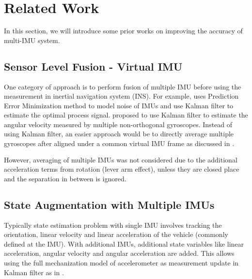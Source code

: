 \documentclass[conference]{IEEEtran}
\begin{document}

\section{Related Work}

In this section, we will introduce some prior works on improving the accuracy of multi-IMU system.


\subsection{Sensor Level Fusion - Virtual IMU}\label{VIMU}

One category of approach is to perform fusion of multiple IMU before using the measurement in inertial navigation system (INS). For example, \cite{jafari2014_PEM} uses Prediction Error Minimization method to model noise of IMUs and use Kalman filter to estimate the optimal process signal. \cite{xue2023} proposed to use Kalman filter to estimate the angular velocity measured by multiple non-orthogonal gyroscopes. Instead of using Kalman filter, an easier approach would be to directly average multiple gyroscopes after aligned under a common virtual IMU frame as discussed in \cite{waegli2008, patel2022_multi-imu, Colomina2004REDUNDANTIF}.

However, averaging of multiple IMUs was not considered due to the additional acceleration terms from rotation (lever arm effect), unless they are closed place and the separation in between is ignored.

\subsection{State Augmentation with Multiple IMUs}\label{augmented}

Typically state estimation problem with single IMU involves tracking the orientation, linear velocity and linear acceleration of the vehicle (commonly defined at the IMU). With additional IMUs, additional state variables like linear acceleration, angular velocity and angular acceleration are added. This allows using the full mechanization model of accelerometer as measurement update in Kalman filter as in \cite{Bancroft2011DataFA, Beaudoin2018_satelite}.
\end{document}
